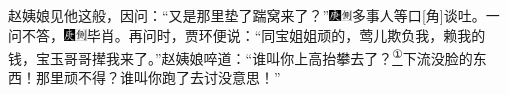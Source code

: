 赵姨娘见他这般，因问：``又是那里垫了踹窝来了？''{\includegraphics[width=3mm]{../Images/00004}\includegraphics[width=3mm]{../Images/00011}\footnotesize \kaishu 多事人等口{[}角{]}谈吐。}一问不答，{\includegraphics[width=3mm]{../Images/00004}\includegraphics[width=3mm]{../Images/00011}\footnotesize \kaishu 毕肖。}再问时，贾环便说：``同宝姐姐顽的，莺儿欺负我，赖我的钱，宝玉哥哥撵我来了。''赵姨娘啐道：``谁叫你上高抬攀去了？\href{../Text/part0024_split_000.html\#lnkback_1_a}{\textsuperscript{①}}下流没脸的东西！那里顽不得？谁叫你跑了去讨没意思！''

